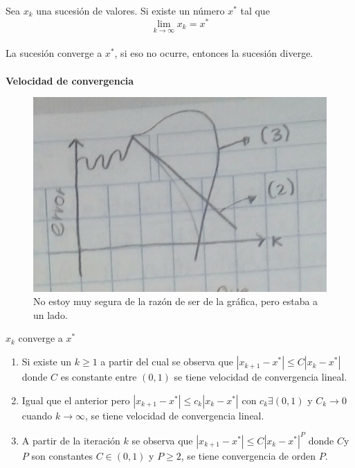 Sea $x_k$ una sucesi\'on de valores. Si existe un n\'umero $x^*$ tal que $$\lim\limits_{k\to\infty}x_k=x^*$$ \\
La sucesi\'on converge a $x^*$, si eso no ocurre, entonces la sucesi\'on diverge.\\
\\
\textbf{Velocidad de convergencia}\\ 
\begin{figure}[h]
\includegraphics[scale=.16]{grafica-junto-vel-conv}
\centering
\caption{No estoy muy segura de la raz\'on de ser de la gr\'afica, pero estaba a un lado.}
\end{figure}

${x_k}$ converge a $x^*$ \\
\begin{enumerate}
\item Si existe un $k\geq 1$ a partir del cual se observa que $|x_{k+1}-x^*|\leq C|x_k-x^*|$ donde $C$ es constante entre $(0,1)$ se tiene velocidad de convergencia lineal.
\item Igual que el anterior pero $|x_{k+1}-x^*|\leq c_k|x_k-x^*|$ con $c_k\exists(0,1)$ y $C_k\to0$ cuando $k\to\infty$, se tiene  velocidad de convergencia lineal.
\item A partir de la iteraci\'on $k$ se observa que $|x_{k+1}-x^*|\leq C{|x_k-x^*|}^P$ donde $C$y $P$ son constantes $C\in(0,1)$ y $P\geq2$, se tiene convergencia de orden $P$.
\end{enumerate}

